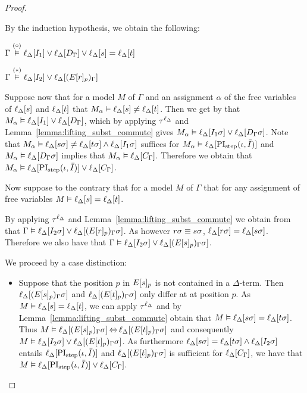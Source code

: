 \begin{proof}
\begin{indproof}
			By the induction hypothesis, we obtain the following: 

			$\Gamma \stackrel{(\circ)}{\vDash} \ell_{\Delta}[I_1] \lor \ell_{\Delta}[D_\Gamma] \lor \ell_{\Delta}[s]=\ell_{\Delta}[t]$

			$\Gamma \stackrel{(*)}{\vDash} \ell_{\Delta}[I_2] \lor \ell_{\Delta}[(E{[r]_{p}})_\Gamma]$

			Suppose now that for a model $M$ of $\Gamma$ and an assignment $\alpha$ of the free variables of $\ell_{\Delta}[s]$ and $\ell_{\Delta}[t]$ that $M_\alpha \vDash \ell_{\Delta}[s]\neq \ell_{\Delta}[t]$.
			Then we get by \markA{} that $M_\alpha \vDash \ell_{\Delta}[I_1] \lor \ell_{\Delta}[D_\Gamma]$, which by applying $\tau^{\ell_\Delta}$ and Lemma~\ref{lemma:lifting_subst_commute} gives $M_\alpha \vDash \ell_{\Delta}[I_1\sigma] \lor \ell_{\Delta}[D_\Gamma\sigma]$.
			Note that $M_\alpha \vDash \ell_{\Delta}[s\sigma]\neq \ell_{\Delta}[t\sigma] \land \ell_{\Delta}[I_1\sigma]$ suffices for $M_\alpha \vDash \ell_{\Delta}[\operatorname{PI}_{\mathrm{step}}(\iota, \bar I)]$ and $M_\alpha \vDash \ell_{\Delta}[D_\Gamma\sigma]$ implies that $M_\alpha \vDash \ell_{\Delta}[C_\Gamma]$.
			Therefore we obtain that 
			$M_\alpha \vDash \ell_{\Delta}[\operatorname{PI}_{\mathrm{step}}(\iota, \bar I)] \lor \ell_{\Delta}[C_\Gamma]$.

			Now suppose to the contrary that for a model $M$ of $\Gamma$ that for any assignment of free variables $M \entails \lifdeltanovar{s}\nolinebreak=\lifdeltanovar{t}$.

			By applying $\tau^{\ell_\Delta}$ and  Lemma~\ref{lemma:lifting_subst_commute} we obtain from \markB{} that
			$\Gamma \vDash \ell_{\Delta}[I_2\sigma] \lor \ell_{\Delta}[(E{[r]_{p}})_\Gamma\sigma]$.
			As however $r\sigma \equiv s\sigma$,
			$\ell_{\Delta}[r\sigma] = \ell_{\Delta}[s\sigma]$.
			Therefore we also have that 
			$\Gamma \vDash \ell_{\Delta}[I_2\sigma] \lor \ell_{\Delta}[(E{[s]_{p}})_\Gamma\sigma]$.

			We proceed by a case distinction:
			\begin{itemize}
				\item Suppose that the position $p$ in $E{[s]_{p}}$ is not contained in a $\Delta$-term.
					Then
					$\ell_{\Delta}[(E{[s]_{p}})_\Gamma\sigma]$
					and
					$\ell_{\Delta}[(E{[t]_{p}})_\Gamma\sigma]$
					only differ at at position $p$.
					As $M \vDash \ell_{\Delta}[s] = \ell_{\Delta}[t]$, we can apply $\tau^{\ell_\Delta}$ and by Lemma~\ref{lemma:lifting_subst_commute} obtain that 
					$M \vDash \ell_{\Delta}[s\sigma] = \ell_{\Delta}[t\sigma]$.
					Thus
					$M\vDash \ell_{\Delta}[(E{[s]_{p}})_\Gamma\sigma] \operatorname{\Leftrightarrow} 
					\ell_{\Delta}[(E{[t]_{p}})_\Gamma\sigma]$
					and consequently
					$M \vDash \ell_{\Delta}[I_2\sigma] \lor \ell_{\Delta}[(E{[t]_{p}})_\Gamma\sigma]$.
					As furthermore $\ell_{\Delta}[s\sigma] =\ell_{\Delta}[t\sigma] \land \ell_{\Delta}[I_2\sigma]$ entails $\ell_{\Delta}[\operatorname{PI}_{\mathrm{step}}(\iota, \bar I)]$
					and $\ell_{\Delta}[(E{[t]_{p}})_\Gamma\sigma]$ is sufficient for $\ell_{\Delta}[C_\Gamma]$,
					we have that 
					$M\vDash \ell_{\Delta}[\operatorname{PI}_{\mathrm{step}}(\iota, \bar I)] \lor \ell_{\Delta}[C_\Gamma]$.


\end{itemize}
\end{indproof}
\end{proof}
